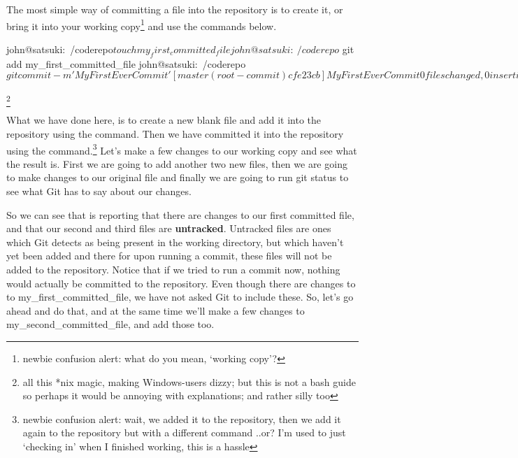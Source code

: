 The most simple way of committing a file into the repository is to create it, or bring it into your working copy\footnote{newbie confusion alert: what do you mean, `working copy'?} and use the commands below.

\begin{code}
john@satsuki:~/coderepo$ touch my_first_committed_file
john@satsuki:~/coderepo$ git add my_first_committed_file
john@satsuki:~/coderepo$ git commit -m 'My First Ever Commit'
[master (root-commit) cfe23cb] My First Ever Commit
 0 files changed, 0 insertions(+), 0 deletions(-)
 create mode 100644 my_first_committed_file
john@satsuki:~/coderepo$
\end{code}
\footnote{all this *nix magic, making Windows-users dizzy; but this is not a bash guide so perhaps it would be annoying with explanations; and rather silly too}

What we have done here, is to create a new blank file and add it into the repository using the  command.
Then we have committed it into the repository using the  command.\footnote{newbie confusion alert: wait, we added it to the repository, then we add it again to the repository but with a different command ..or? I'm used to just `checking in' when I finished working, this is a hassle}
Let's make a few changes to our working copy and see what the result is.
First we are going to add another two new files, then we are going to make changes to our original file and finally we are going to run git status to see what Git has to say about our changes.


So we can see that  is reporting that there are changes to our first committed file, and that our second and third files are \textbf{untracked}.
Untracked files are ones which Git detects as being present in the working directory, but which haven't yet been added and there for upon running a commit, these files will not be added to the repository.
Notice that if we tried to run a commit now, nothing would actually be committed to the repository.
Even though there are changes to to my\_first\_committed\_file, we have not asked Git to include these.
So, let's go ahead and do that, and at the same time we'll make a few changes to my\_second\_committed\_file, and add those too.

